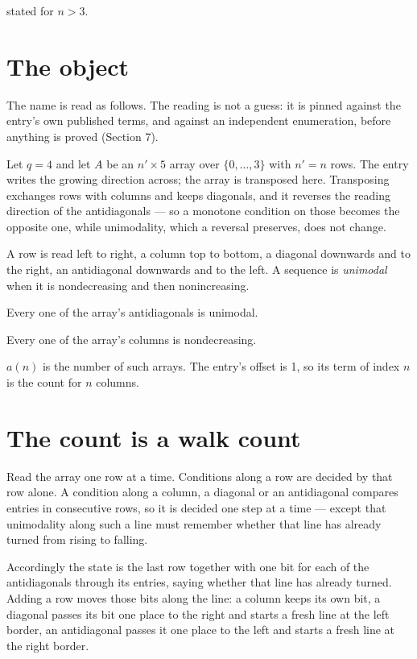\documentclass[11pt]{article}
\theoremstyle{definition}
\begin{document}
stated for $n > 3$.

\section{The object}

The name is read as follows. The reading is not a guess: it is pinned against the entry's own published terms, and against an independent enumeration, before anything is proved (Section 7).

Let $q = 4$ and let $A$ be an $n' \times 5$ array over $\{0,\dots,3\}$ with $n' = n$ rows. The entry writes the growing direction across; the array is transposed here. Transposing exchanges rows with columns and keeps diagonals, and it reverses the reading direction of the antidiagonals --- so a monotone condition on those becomes the opposite one, while unimodality, which a reversal preserves, does not change.

A row is read left to right, a column top to bottom, a diagonal downwards and to the right, an antidiagonal downwards and to the left. A sequence is {\itshape unimodal} when it is nondecreasing and then nonincreasing.

Every one of the array's antidiagonals is unimodal.

Every one of the array's columns is nondecreasing.

$a(n)$ is the number of such arrays. The entry's offset is 1, so its term of index $n$ is the count for $n$ columns.

\section{The count is a walk count}

Read the array one row at a time. Conditions along a row are decided by that row alone. A condition along a column, a diagonal or an antidiagonal compares entries in consecutive rows, so it is decided one step at a time --- except that unimodality along such a line must remember whether that line has already turned from rising to falling.

Accordingly the state is the last row together with one bit for each of the antidiagonals through its entries, saying whether that line has already turned. Adding a row moves those bits along the line: a column keeps its own bit, a diagonal passes its bit one place to the right and starts a fresh line at the left border, an antidiagonal passes it one place to the left and starts a fresh line at the right border.
\end{document}
